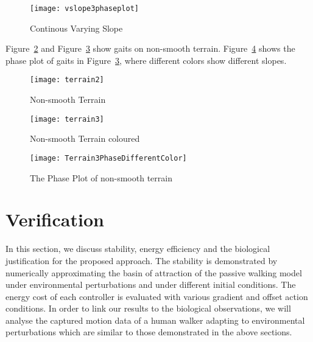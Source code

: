 \begin{figure}[!htbp]
  \begin{center}
      \texttt{[image: vslope3phaseplot]}
    \caption{Continous Varying Slope}
    \label{fig:vp2phas}
\end{center}
\end{figure}



Figure~\ref{fig:nonsmoothterrain1} and Figure~\ref{fig:nonsmootterrain2} show gaits on non-smooth terrain.
Figure~\ref{fig:diffterrain2} shows the phase plot of gaits in Figure~\ref{fig:nonsmootterrain2}, where different colors show different slopes.
\begin{figure}[!htbp]
  \begin{center}
      \texttt{[image: terrain2]}
    \caption{Non-smooth Terrain }
    \label{fig:nonsmoothterrain1}
\end{center}
\end{figure}

\begin{figure}[!htbp]
  \begin{center}
      \texttt{[image: terrain3]}
    \caption{Non-smooth Terrain coloured}
    \label{fig:nonsmootterrain2}
\end{center}
\end{figure}


\begin{figure}[!htbp]
  \begin{center}
    \texttt{[image: Terrain3PhaseDifferentColor]}
    \caption{The Phase Plot of non-smooth terrain}
    \label{fig:diffterrain2}
\end{center}
\end{figure}



\section{Verification}
In this section, we discuss stability, energy efficiency and the biological justification for the proposed approach. 
The stability is demonstrated by numerically approximating the basin of attraction of the passive walking model under environmental perturbations and under different initial conditions. 
The energy cost of each controller is evaluated with various gradient and offset action conditions. 
In order to link our results to the biological observations, we will analyse the captured motion data of a human walker adapting to environmental perturbations which are similar to those demonstrated in the above sections.
